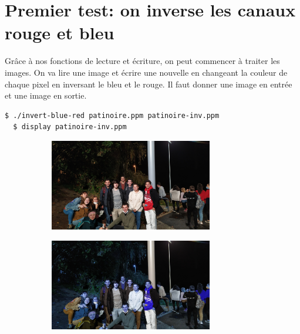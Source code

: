 \documentclass[a4paper,10pt]{article}
\begin{document}
    \section{Premier test: on inverse les canaux rouge et bleu}
    Grâce à nos fonctions de lecture et écriture, on peut commencer à traiter les images. On va lire une image et écrire une nouvelle en changeant la couleur de chaque pixel en inversant le bleu et le rouge. Il faut donner une image en entrée et une image en sortie.
    \begin{lstlisting}[language=Bash]
  $ ./invert-blue-red patinoire.ppm patinoire-inv.ppm
  $ display patinoire-inv.ppm
  \end{lstlisting}
   \begin{figure}[h]
   \begin{subfigure}{0.6\textwidth}
    \includegraphics[width=1\linewidth, height=4cm]{patinoire}   
    \end{subfigure}
     \begin{subfigure}{0.6\textwidth}
    \includegraphics[width=1\linewidth, height=4cm]{patinoire-inv}   
    \end{subfigure}
    \end{figure}
    \pagebreak
\end{document}
